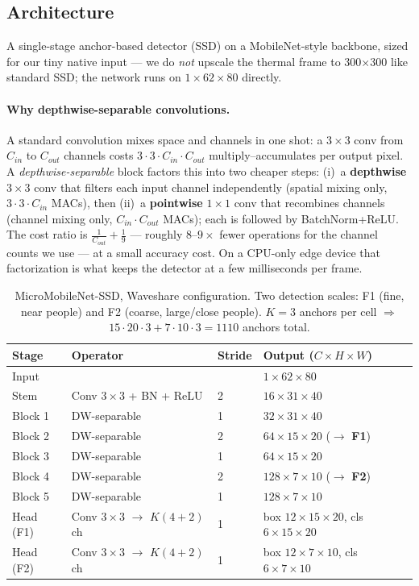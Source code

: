 \documentclass[11pt]{article}
\begin{document}
\subsection{Architecture}

A single-stage anchor-based detector (SSD) on a MobileNet-style backbone,
sized for our tiny native input --- we do \emph{not} upscale the thermal
frame to 300$\times$300 like standard SSD; the network runs on
$1\times62\times80$ directly.

\paragraph{Why depthwise-separable convolutions.}
A standard convolution mixes space and channels in one shot: a
$3{\times}3$ conv from $C_{in}$ to $C_{out}$ channels costs
$3\!\cdot\!3\!\cdot\!C_{in}\!\cdot\!C_{out}$ multiply--accumulates per
output pixel. A \emph{depthwise-separable} block factors this into two
cheaper steps: (i)~a \textbf{depthwise} $3{\times}3$ conv that filters each
input channel independently (spatial mixing only, $3\!\cdot\!3\!\cdot\!C_{in}$
MACs), then (ii)~a \textbf{pointwise} $1{\times}1$ conv that recombines
channels (channel mixing only, $C_{in}\!\cdot\!C_{out}$ MACs); each is
followed by BatchNorm+ReLU. The cost ratio is
$\tfrac{1}{C_{out}}+\tfrac{1}{9}$ --- roughly $8$--$9\times$ fewer
operations for the channel counts we use --- at a small accuracy cost. On a
CPU-only edge device that factorization is what keeps the detector at a few
milliseconds per frame.

\begin{table}[H]\centering\small
\begin{tabular}{llll}
\toprule
Stage & Operator & Stride & Output ($C\times H\times W$)\\
\midrule
Input &  &  & $1\times62\times80$\\
Stem & Conv $3{\times}3$ + BN + ReLU & 2 & $16\times31\times40$\\
Block 1 & DW-separable & 1 & $32\times31\times40$\\
Block 2 & DW-separable & 2 & $64\times15\times20$ \; ($\rightarrow$ \textbf{F1})\\
Block 3 & DW-separable & 1 & $64\times15\times20$\\
Block 4 & DW-separable & 2 & $128\times7\times10$ \; ($\rightarrow$ \textbf{F2})\\
Block 5 & DW-separable & 1 & $128\times7\times10$\\
\midrule
Head (F1) & Conv $3{\times}3$ $\rightarrow$ $K(4{+}2)$ ch & 1 & box $12\times15\times20$, cls $6\times15\times20$\\
Head (F2) & Conv $3{\times}3$ $\rightarrow$ $K(4{+}2)$ ch & 1 & box $12\times7\times10$, cls $6\times7\times10$\\
\bottomrule
\end{tabular}
\caption{MicroMobileNet-SSD, Waveshare configuration. Two detection
scales: F1 (fine, near people) and F2 (coarse, large/close people).
$K{=}3$ anchors per cell $\Rightarrow$ $15{\cdot}20{\cdot}3 +
7{\cdot}10{\cdot}3 = 1110$ anchors total.}
\end{table}
\end{document}
